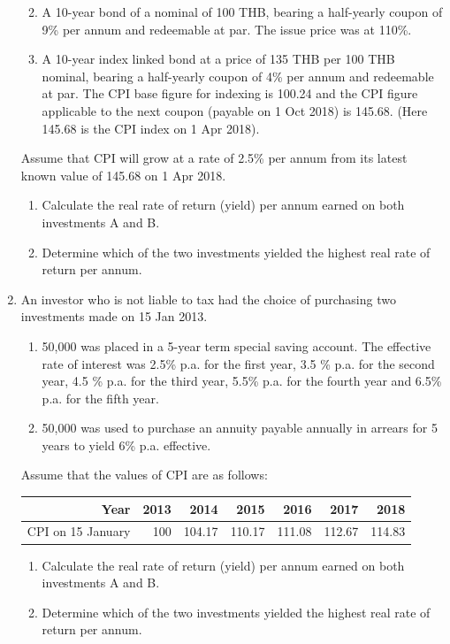 \documentclass[
]{book}
\theoremstyle{definition}
\theoremstyle{definition}
\theoremstyle{definition}
\theoremstyle{definition}
\theoremstyle{remark}
\begin{document}
\begin{enumerate}
  \begin{enumerate}
  \def\labelenumii{(\Alph{enumii})}
  \item
    A 10-year bond of a nominal of 100 THB, bearing a half-yearly coupon of
    9\% per annum and redeemable at par. The issue price was at 110\%.
  \item
    A 10-year index linked bond at a price of 135 THB per 100 THB nominal, bearing a
    half-yearly coupon of 4\% per annum and redeemable at par. The
    CPI base figure for indexing is 100.24 and the CPI figure
    applicable to the next coupon (payable on 1 Oct 2018) is 145.68.
    (Here 145.68 is the CPI index on 1 Apr 2018).
  \end{enumerate}

  Assume that CPI will grow at a rate of 2.5\% per annum from its
  latest known value of 145.68 on 1 Apr 2018.

  \begin{enumerate}
  \def\labelenumii{\arabic{enumii}.}
  \item
    Calculate the real rate of return (yield) per annum earned on
    both investments A and B.
  \item
    Determine which of the two investments yielded the highest real
    rate of return per annum.
  \end{enumerate}
\item
  An investor who is not liable to tax had the choice of purchasing
  two investments made on 15 Jan 2013.

  \begin{enumerate}
  \def\labelenumii{(\Alph{enumii})}
  \item
    50,000 was placed in a 5-year term special saving account. The
    effective rate of interest was 2.5\% p.a. for the first year, 3.5
    \% p.a. for the second year, 4.5 \% p.a. for the third year, 5.5\%
    p.a. for the fourth year and 6.5\% p.a. for the fifth year.
  \item
    50,000 was used to purchase an annuity payable annually in arrears
    for 5 years to yield 6\% p.a. effective.
  \end{enumerate}

  Assume that the values of CPI are as follows:

  \begin{longtable}[]{@{}rrrrrrr@{}}
  \toprule\noalign{}
  Year & 2013 & 2014 & 2015 & 2016 & 2017 & 2018 \\
  \midrule\noalign{}
  \endhead
  \bottomrule\noalign{}
  \endlastfoot
  CPI on 15 January & 100 & 104.17 & 110.17 & 111.08 & 112.67 & 114.83 \\
  \end{longtable}

  \begin{enumerate}
  \def\labelenumii{\arabic{enumii}.}
  \item
    Calculate the real rate of return (yield) per annum earned on
    both investments A and B.
  \item
    Determine which of the two investments yielded the highest real
    rate of return per annum.
  \end{enumerate}
\end{enumerate}
\end{document}

